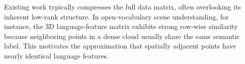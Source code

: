 \documentclass{article}
\begin{document}
Existing work typically compresses the full data matrix, often overlooking its inherent low‑rank structure. In open‑vocabulary scene understanding, for instance, the 3D language‑feature matrix exhibits strong row‑wise similarity because neighboring points in a dense cloud usually share the same semantic label. This motivates the approximation that spatially adjacent points have nearly identical language features.

\end{document}
